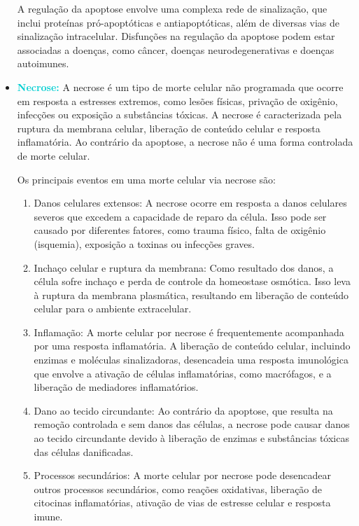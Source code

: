 \documentclass[11pt,a4paper]{article}
\begin{document}
\begin{itemize}
				A regulação da apoptose envolve uma complexa rede de sinalização, que inclui proteínas pró-apoptóticas e antiapoptóticas, além de diversas vias de sinalização intracelular. Disfunções na regulação da apoptose podem estar associadas a doenças, como câncer, doenças neurodegenerativas e doenças autoimunes.

			\item \textcolor{DarkTurquoise}{\textbf{Necrose:}} A necrose é um tipo de morte celular não programada que ocorre em resposta a estresses extremos, como lesões físicas, privação de oxigênio, infecções ou exposição a substâncias tóxicas. A necrose é caracterizada pela ruptura da membrana celular, liberação de conteúdo celular e resposta inflamatória. Ao contrário da apoptose, a necrose não é uma forma controlada de morte celular.
			
				Os principais eventos em uma morte celular via necrose são:

				\begin{enumerate}
					\item Danos celulares extensos: A necrose ocorre em resposta a danos celulares severos que excedem a capacidade de reparo da célula. Isso pode ser causado por diferentes fatores, como trauma físico, falta de oxigênio (isquemia), exposição a toxinas ou infecções graves.

					\item Inchaço celular e ruptura da membrana: Como resultado dos danos, a célula sofre inchaço e perda de controle da homeostase osmótica. Isso leva à ruptura da membrana plasmática, resultando em liberação de conteúdo celular para o ambiente extracelular.
					
					\item Inflamação: A morte celular por necrose é frequentemente acompanhada por uma resposta inflamatória. A liberação de conteúdo celular, incluindo enzimas e moléculas sinalizadoras, desencadeia uma resposta imunológica que envolve a ativação de células inflamatórias, como macrófagos, e a liberação de mediadores inflamatórios.
					
					\item Dano ao tecido circundante: Ao contrário da apoptose, que resulta na remoção controlada e sem danos das células, a necrose pode causar danos ao tecido circundante devido à liberação de enzimas e substâncias tóxicas das células danificadas.
					
					\item Processos secundários: A morte celular por necrose pode desencadear outros processos secundários, como reações oxidativas, liberação de citocinas inflamatórias, ativação de vias de estresse celular e resposta imune.
				\end{enumerate}


\end{itemize}
\end{document}
